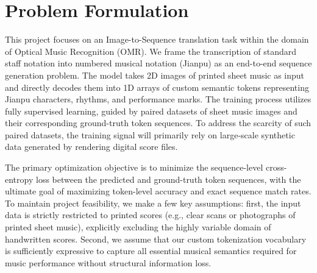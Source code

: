 \section{Problem Formulation}
This project focuses on an Image-to-Sequence translation task within the domain of Optical Music Recognition (OMR). We frame the transcription of standard staff notation into numbered musical notation (Jianpu) as an end-to-end sequence generation problem. The model takes 2D images of printed sheet music as input and directly decodes them into 1D arrays of custom semantic tokens representing Jianpu characters, rhythms, and performance marks. The training process utilizes fully supervised learning, guided by paired datasets of sheet music images and their corresponding ground-truth token sequences. To address the scarcity of such paired datasets, the training signal will primarily rely on large-scale synthetic data generated by rendering digital score files.

The primary optimization objective is to minimize the sequence-level cross-entropy loss between the predicted and ground-truth token sequences, with the ultimate goal of maximizing token-level accuracy and exact sequence match rates. To maintain project feasibility, we make a few key assumptions: first, the input data is strictly restricted to printed scores (e.g., clear scans or photographs of printed sheet music), explicitly excluding the highly variable domain of handwritten scores. Second, we assume that our custom tokenization vocabulary is sufficiently expressive to capture all essential musical semantics required for music performance without structural information loss.